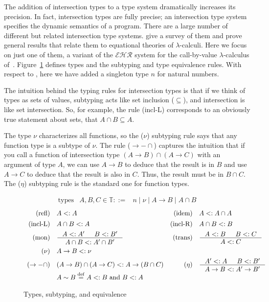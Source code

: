 \documentclass{tufte-handout}
\newcommand{\defeq}[0]{\overset{\mathrm{def}}{=}}
\begin{document}
\newcommand{\UP}[1]{\mathop{\uparrow}\! #1}


The addition of intersection types to a type system dramatically
increases its precision. In fact, intersection types are fully
precise; an intersection type system specifies the dynamic semantics
of a program.
%
There are a large number of different but related intersection type
systems. \citet{Alessi:2006aa} give a survey of them and prove general
results that relate them to equational theories of
$\lambda$-calculi. Here we focus on just one of them, a variant of the
$\mathcal{EHR}$ system for the call-by-value $\lambda$-calculus
of~\citet{Egidi:1992aa}. Figure~\ref{fig:intersection-types} defines
types and the subtyping and type equivalence rules.  With respect to
\citet{Egidi:1992aa}, here we have added a singleton type $n$ for
natural numbers. 

The intuition behind the typing rules for intersection types is that
if we think of types as sets of values, subtyping acts like set
inclusion ($\subseteq$), and intersection is like set
intersection. So, for example, the rule (incl-L) corresponds to an
obviously true statement about sets, that $A \cap B \subseteq A$.

The type $\nu$ characterizes all functions, so the ($\nu$) subtyping
rule says that any function type is a subtype of $\nu$. The rule
($\to{-}\cap$) captures the intuition that if you call a function of
intersection type $(A \to B) \cap (A \to C)$ with an argument of type
$A$, we can use $A \to B$ to deduce that the result is in $B$ and use
$A \to C$ to deduce that the result is also in $C$. Thus, the result
must be in $B \cap C$. The ($\eta$) subtyping rule is the standard one
for function types.

\begin{figure}
\[
\begin{array}{lrl}
  \text{types} & A,B,C \in \mathbb{T} ::= & n \mid \nu \mid A \to B \mid A \cap B
\end{array}
\]
\[
\begin{array}{rlrl}
  \text{(refl)} &  A <: A & \text{(idem)} & A <: A \cap A \\[1ex]
  \text{(incl-L)} & A \cap B <: A & \text{(incl-R)} & A \cap B <: B\\[1ex]
  \text{(mon)} & \inference{A <: A' & B <: B'}{A \cap B <: A' \cap B'} &
  \text{(trans)} & \inference{A <: B & B <: C}{A <: C} \\[2ex]
  \text{($\nu$)} & A \to B <: \nu \\[1ex]
  \text{($\to{-}\cap$)} & (A \to B) \cap (A \to C) <: A \to (B \cap C) &
  \text{($\eta$)} & \inference{A' <: A & B <: B'}
       {A \to B <: A' \to B'} \\[1ex]
  & A \sim B \defeq A <: B \text{ and } B <: A
\end{array}
\]
\caption{Types, subtyping, and equivalence}
\label{fig:intersection-types}
\end{figure}
\end{document}
